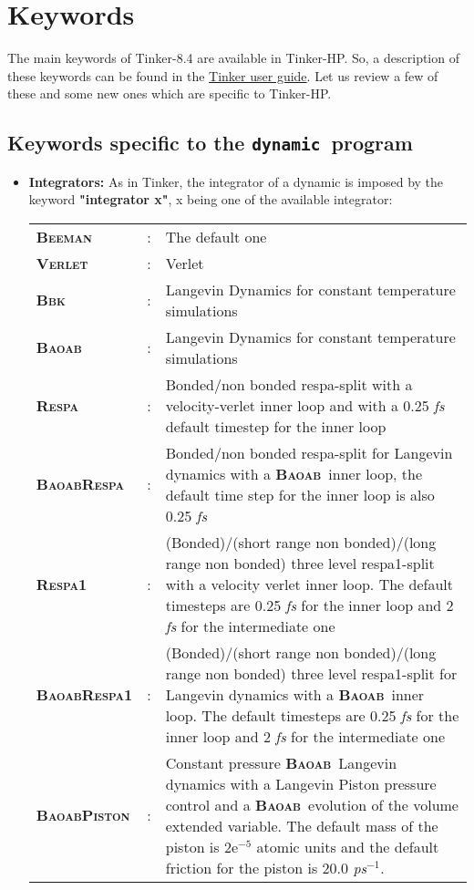 \documentclass[peerreview]{IEEEtran}
\def\dynamic{\texttt{dynamic}}
\def\beeman{\textbf{\textsc{Beeman}}}
\def\verlet{\textbf{\textsc{Verlet}}}
\def\bbk{\textbf{\textsc{Bbk}}}
\def\baoab{\textbf{\textsc{Baoab}}}
\def\respa{\textbf{\textsc{Respa}}}
\def\baoabrespa{\textbf{\textsc{BaoabRespa}}}
\def\respaone{\textbf{\textsc{Respa1}}}
\def\baoabrespaone{\textbf{\textsc{BaoabRespa1}}}
\def\baoabpiston{\textbf{\textsc{BaoabPiston}}}
\newlength{\mylen}
\begin{document}
\section{Keywords}
The main keywords of Tinker-8.4 are available in Tinker-HP. So, a description of these keywords can be found in the \href{https://dasher.wustl.edu/tinker/downloads/guide.pdf}{Tinker user guide}. Let us review a few of these and some new ones which are specific to  Tinker-HP.

\settowidth{\mylen}{\baoabpiston}
\subsection{Keywords specific to the \dynamic\  program}
\begin{itemize}

\item \textbf{Integrators: } 
As in Tinker, the integrator of a dynamic is imposed by the keyword \textbf{"integrator x"}, x being one of the available integrator:

\setlength{\tabcolsep}{2pt}
\begin{tabular}{llp{14.60cm}}
\beeman &:& The default one\\
\verlet &: & Verlet\\
\bbk &: &Langevin Dynamics for constant temperature simulations\\
\baoab &: &Langevin Dynamics for constant temperature simulations\\
\respa &: &Bonded/non bonded respa-split with a velocity-verlet inner loop and with a 0.25 {\em fs} default timestep for the inner loop\\
\baoabrespa & : & Bonded/non bonded respa-split for Langevin dynamics with a \baoab\ inner loop, the default time step for the inner loop is also 0.25 {\em fs}\\
\respaone & : &(Bonded)/(short range non bonded)/(long range non bonded) three level respa1-split with a velocity verlet inner loop. The default timesteps are 0.25 {\em fs} for the inner loop and 2 {\em fs} for the intermediate one\\
\baoabrespaone &: &(Bonded)/(short range non bonded)/(long range non bonded) three level respa1-split for Langevin dynamics with a \baoab\ inner loop. The default timesteps are 0.25 {\em fs} for the inner loop and 2 {\em fs} for the intermediate one\\
\baoabpiston &:& Constant pressure \baoab\  Langevin dynamics with a Langevin Piston pressure control and a \baoab\  evolution of the volume extended variable. The default mass of the piston is 2e$^{-5}$ atomic units and the default friction for the piston is 20.0  {\em ps}$^{-1}$.\\
\end{tabular}


\end{itemize}
\end{document}
